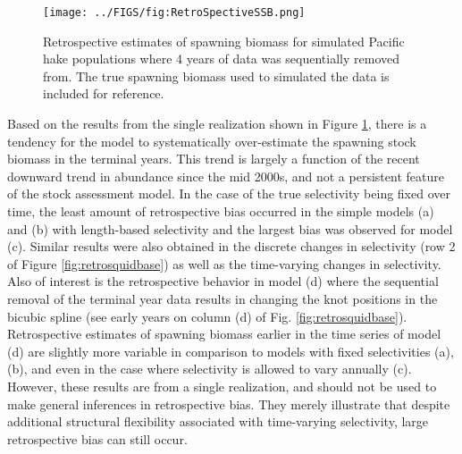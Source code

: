 \begin{figure}[!tbh]
	\begin{center}
		\texttt{[image: ../FIGS/fig:RetroSpectiveSSB.png]}
	\end{center}
	\caption{Retrospective estimates of spawning biomass for simulated Pacific hake populations where 4 years of data was sequentially removed from.  The true spawning biomass used to simulated the data is included for reference.}
	\label{fig:retrospectiveSSB}
\end{figure}

Based on the results from the single realization shown in Figure \ref{fig:retrospectiveSSB}, there is a tendency for the model to systematically over-estimate the spawning stock biomass in the terminal years.  This trend is largely a function of the recent downward trend in abundance since the mid 2000s, and not a persistent feature of the stock assessment model.  In the case of the true selectivity being fixed over time, the least amount of retrospective bias occurred in the simple models (a) and (b) with length-based selectivity and the largest bias was observed for model (c).  Similar results were also obtained in the discrete changes in selectivity (row 2 of Figure \ref{fig:retrosquidbase}) as well as the time-varying changes in selectivity.  Also of interest is the retrospective behavior in model (d) where the sequential removal of the terminal year data results in changing the knot positions in the bicubic spline (see early years on column (d) of Fig. \ref{fig:retrosquidbase}). Retrospective  estimates of spawning biomass earlier in the time series of model (d) are slightly more variable in comparison to models with fixed selectivities (a), (b), and even in the case where selectivity is allowed to vary annually (c).  However, these results are from a single realization, and should not be used to make general inferences in retrospective bias.  They merely illustrate that despite additional structural flexibility associated with time-varying selectivity, large retrospective bias can still occur. 




